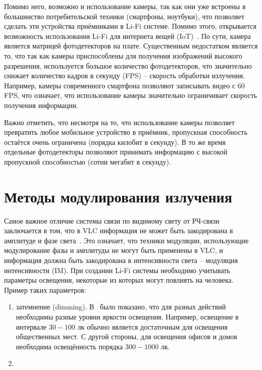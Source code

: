 
Помимо него, возможно и использование камеры, так как они уже встроены в большинство потребительской техники (смартфоны, ноутбуки), что позволяет сделать эти устройства приёмниками в Li-Fi системе. Помимо этого, открывается возможность использования Li-Fi для интернета вещей (IoT)~\cite{Duquel2018}. По сути, камера является матрицей фотодетекторов на плате. Существенным недостатком является то, что так как камеры приспособлены для получения изображений высокого разрешения, используется большое количество фотодетекторов, что значительно снижает количество кадров в секунду (FPS) \--- скорость обработки излучения. Например, камеры современного смартфона позволяют записывать видео с 60 FPS, что означает, что использование камеры значительно ограничивает скорость получения информации. 

Важно отметить, что несмотря на то, что использование камеры позволяет превратить любое мобильное устройство в приёмник, пропускная способность остаётся очень ограничена (порядка килобит в секунду). В то же время отдельные фотодетекторы позволяют принимать информацию с высокой пропускной способностью (сотни мегабит в секунду).

\section{Методы модулирования излучения}


Самое важное отличие системы связи по видимому свету от РЧ-связи заключается в том, что в VLC информация не может быть закодирована в амплитуде и фазе света~\cite{Tsonev2013}. Это означает, что техники модуляции, использующие модулирование фазы и амплитуды не могут быть применены в VLC, и информация должна быть закодирована в интенсивности света \--- модуляция интенсивности (IM). При создании Li-Fi системы необходимо учитывать параметры освещения, некоторые из которых могут повлиять на человека. Пример таких параметров: 

\begin{enumerate}
    \item затемнение (dimming). В~\cite{Zukauskas2002} было показано, что для разных действий необходимы разные уровни яркости освещения. Например, освещение в интервале $30-100$ лк обычно является достаточным для освещения общественных мест. С другой стороны, для освещения офисов и домов необходима освещённость порядка $300-1000$ лк. 
\item 
\end{enumerate}


